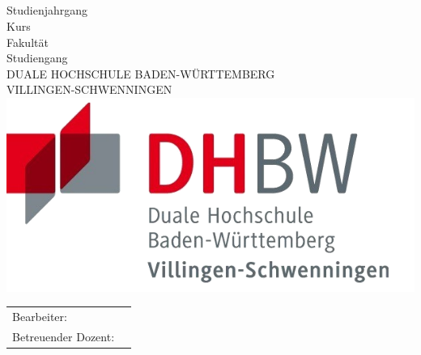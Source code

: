 
\thispagestyle{empty}

\begin{center}
\vspace*{1cm} \ \\
{\fontsize{40}{48}\selectfont \bfseries \mytitlewithlinebreaks \\}
\vspace{0.75cm}
{\Large\bfseries \mysubtitlewithlinebreaks \\}
\vspace{1.5cm}
\mytexttype \\
Studienjahrgang \myyearofstudy \\
Kurs \mycourse \\
\vspace{1.5cm}
Fakultät \myfaculty \\
Studiengang \mycourseofstudy \\
DUALE HOCHSCHULE BADEN-WÜRTTEMBERG\\
VILLINGEN-SCHWENNINGEN\\
\vspace{2.5cm}
\includegraphics[width=.45\linewidth]{../assets/dhbw-vs-logo}
\end{center}
\begin{table}[b]
\begin{tabular}{ll}
Bearbeiter: 		&	\myauthor \\
Betreuender Dozent:	&	\mylecturer \\
\end{tabular}\\
\end{table}
